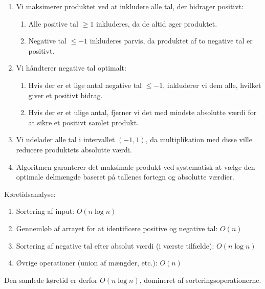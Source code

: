 \documentclass[12pt,a4paper]{article}
\begin{document}
\begin{enumerate}
    \item Vi maksimerer produktet ved at inkludere alle tal, der bidrager positivt:
    \begin{enumerate}
        \item Alle positive tal $\geq 1$ inkluderes, da de altid øger produktet.
        \item Negative tal $\leq -1$ inkluderes parvis, da produktet af to negative tal er positivt.
    \end{enumerate}
    
    \item Vi håndterer negative tal optimalt:
    \begin{enumerate}
        \item Hvis der er et lige antal negative tal $\leq -1$, inkluderer vi dem alle, hvilket giver et positivt bidrag.
        \item Hvis der er et ulige antal, fjerner vi det med mindste absolutte værdi for at sikre et positivt samlet produkt.
    \end{enumerate}
    
    \item Vi udelader alle tal i intervallet $(-1, 1)$, da multiplikation med disse ville reducere produktets absolutte værdi.
    
    \item Algoritmen garanterer det maksimale produkt ved systematisk at vælge den optimale delmængde baseret på tallenes fortegn og absolutte værdier.
\end{enumerate}

Køretidsanalyse:
\begin{enumerate}
    \item Sortering af input: $O(n \log n)$
    \item Gennemløb af arrayet for at identificere positive og negative tal: $O(n)$
    \item Sortering af negative tal efter absolut værdi (i værste tilfælde): $O(n \log n)$
    \item Øvrige operationer (union af mængder, etc.): $O(n)$
\end{enumerate}

Den samlede køretid er derfor $O(n \log n)$, domineret af sorteringsoperationerne.
\end{document}
